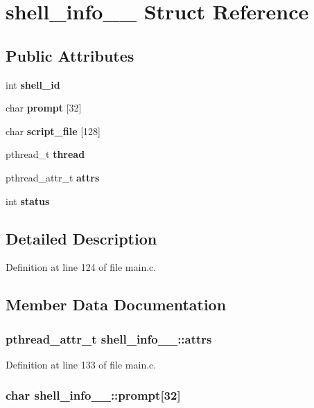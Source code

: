 \section{shell\_\-info\_\-\_\- Struct Reference}
\label{structshell__info____}
\subsection*{Public Attributes}
\begin{CompactItemize}
\item 
int {\bf shell\_\-id}
\item 
char {\bf prompt} [32]
\item 
char {\bf script\_\-file} [128]
\item 
pthread\_\-t {\bf thread}
\item 
pthread\_\-attr\_\-t {\bf attrs}
\item 
int {\bf status}
\end{CompactItemize}


\subsection{Detailed Description}


Definition at line 124 of file main.c.

\subsection{Member Data Documentation}
\subsubsection[{attrs}]{\setlength{\rightskip}{0pt plus 5cm}pthread\_\-attr\_\-t {\bf shell\_\-info\_\-\_\-::attrs}}\label{structshell__info_____93a6af8ad1908b17c3256acced9eba11}




Definition at line 133 of file main.c.
\subsubsection[{prompt}]{\setlength{\rightskip}{0pt plus 5cm}char {\bf shell\_\-info\_\-\_\-::prompt}[32]}\label{structshell__info_____fbed73ddf245e9b210b3e39e74d7c3d9}




